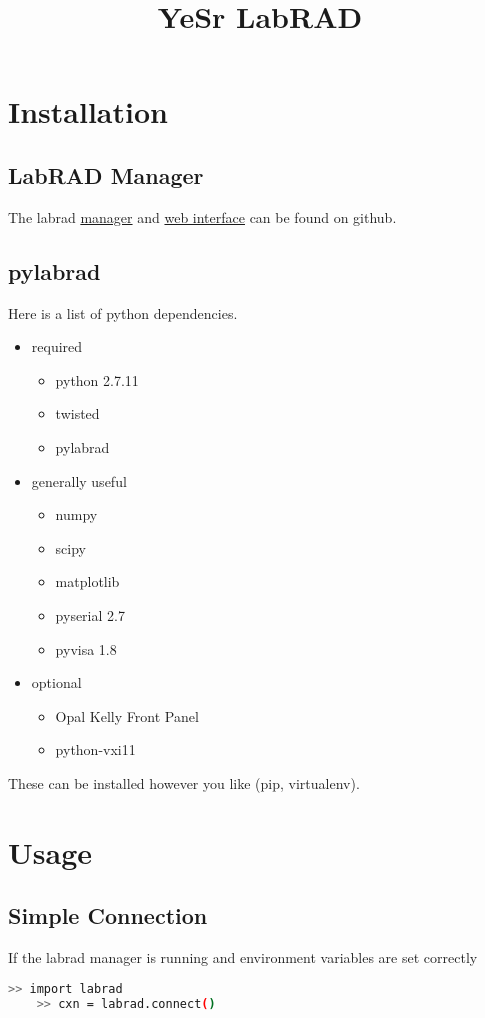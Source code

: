
\usepackage{listings}
\title{YeSr LabRAD}

\maketitle

\section{Installation}
\subsection{LabRAD Manager}
The labrad \href{https://github.com/labrad/scalabrad}{manager} and \href{https://github.com/labrad/scalabrad-web}{web interface} can be found on github. 

\subsection{pylabrad}
Here is a list of python dependencies. 
\begin{itemize}
    \item required
    \begin{itemize}
        \item python 2.7.11
        \item twisted
        \item pylabrad
    \end{itemize}
    \item generally useful
    \begin{itemize}
        \item numpy 
        \item scipy
        \item matplotlib
        \item pyserial 2.7
        \item pyvisa 1.8
    \end{itemize}
    \item optional
    \begin{itemize}
        \item Opal Kelly Front Panel
        \item python-vxi11
    \end{itemize}
\end{itemize}
These can be installed however you like (pip, virtualenv).

\section{Usage}
\subsection{Simple Connection}
If the labrad manager is running and environment variables are set correctly
\begin{lstlisting}[language=bash]
    >> import labrad
    >> cxn = labrad.connect()
\end{lstlisting}



